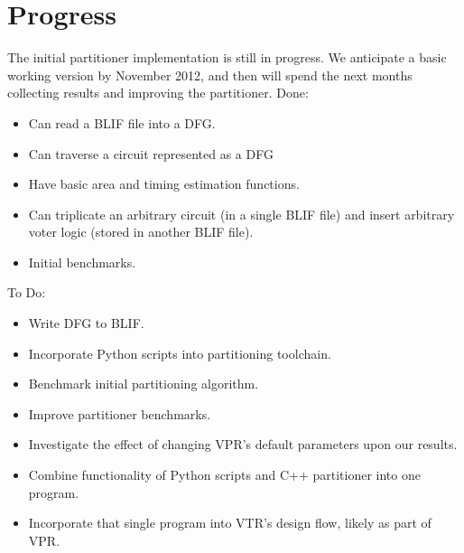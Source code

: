 \documentclass[12pt,final,oneside]{dwThesis} %
\begin{document}
\section{Progress}
The initial partitioner implementation is still in progress. We anticipate a basic working version by November 2012, and then will spend the next months collecting results and improving the partitioner.
Done:
\begin{itemize}
    \item Can read a \ac{BLIF} file into a \ac{DFG}.
    \item Can traverse a circuit represented as a \ac{DFG}
    \item Have basic area and timing estimation functions.
    \item Can triplicate an arbitrary circuit (in a single \ac{BLIF} file) and insert arbitrary voter logic (stored in another \ac{BLIF} file).
    \item Initial benchmarks.
\end{itemize}
To Do:
\begin{itemize}
    \item Write \ac{DFG} to \ac{BLIF}.
    \item Incorporate Python scripts into partitioning toolchain.
    \item Benchmark initial partitioning algorithm.
    \item Improve partitioner benchmarks.
    \item Investigate the effect of changing \ac{VPR}'s default parameters upon our results.
    \item Combine functionality of Python scripts and C++ partitioner into one program.
    \item Incorporate that single program into \ac{VTR}'s design flow, likely as part of \ac{VPR}.
\end{itemize}
\end{document}

